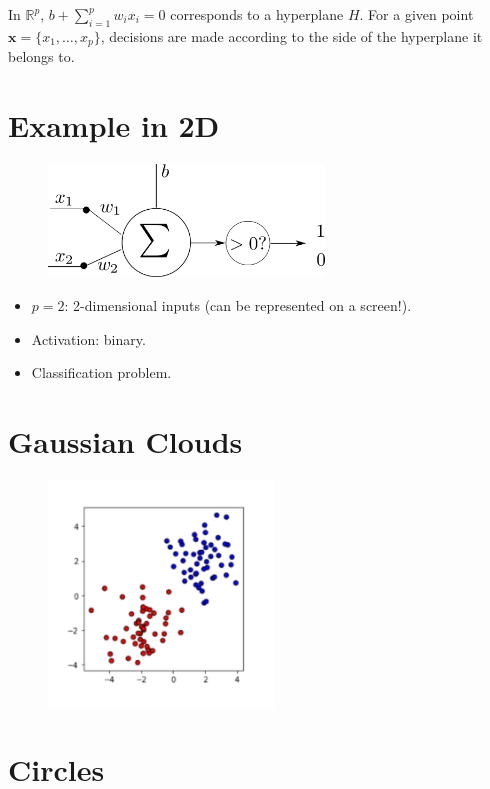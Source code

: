 \documentclass{book}
\newcommand{\x}{\mathbf{x}}
\newcommand{\R}{\mathbb{R}}
\begin{document}
\begin{block}{}
In $\R^p$, $b + \sum\limits_{i=1}^p w_ix_i = 0$ corresponds to a hyperplane $H$. For a given point $\x = \{x_1, \ldots, x_p\}$, decisions are made according to the side of the hyperplane it belongs to.
\end{block}

\section{Example in 2D}

\begin{figure}[h]
    \centering
    \includegraphics[height=3cm]{neurone_simple}
\end{figure}

\begin{itemize}
\item $p=2$: 2-dimensional inputs (can be represented on a screen!).
\item Activation: binary.
\item Classification problem.
\end{itemize}

\section{Gaussian Clouds}

\begin{figure}[h]
    \centering
    \includegraphics[height=6cm]{gaussian_clouds}
\end{figure}

\section{Circles}
\end{document}
